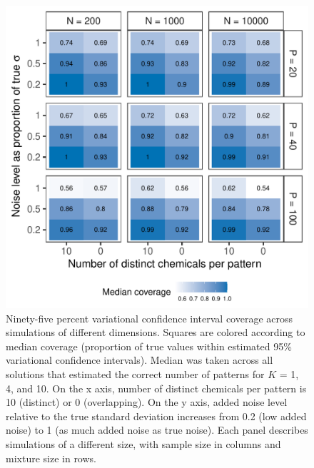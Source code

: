 \begin{figure}[!htbp]
\caption{Ninety-five percent variational confidence interval coverage across simulations of different dimensions. Squares are colored according to median coverage (proportion of true values within estimated 95\% variational confidence intervals). Median was taken across all solutions that estimated the correct number of patterns for $K$ = 1, 4, and 10. On the x axis, number of distinct chemicals per pattern is 10 (distinct) or 0 (overlapping). On the y axis, added noise level relative to the true standard deviation increases from 0.2 (low added noise) to 1 (as much added noise as true noise). Each panel describes simulations of a different size, with sample size in columns and mixture size in rows.}
\label{fig:dim_coverage}
\centering
\includegraphics[scale = 0.8]{./figures/coverage_dim_np.pdf}
\end{figure}

